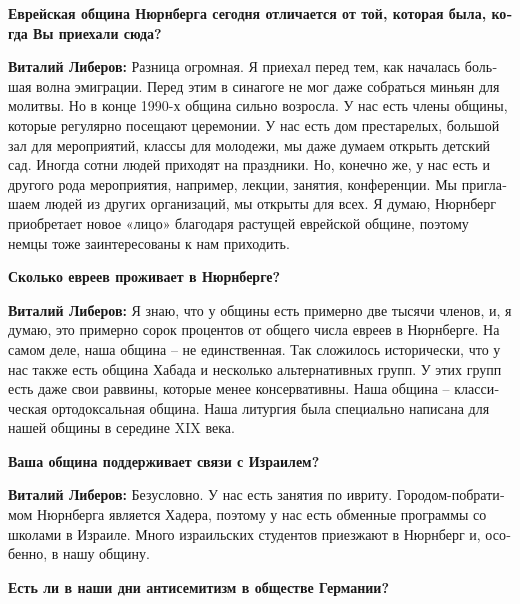 \begin{otherlanguage}{russian}
	\textbf{Еврейская община Нюрнберга сегодня отличается от той, которая была, когда Вы приехали сюда?}
	
	\textbf{Виталий Либеров:} Разница огромная. Я приехал перед тем, как началась большая волна эмиграции. Перед этим в синагоге не мог даже собраться миньян для молитвы. Но в конце 1990-х община сильно возросла. У нас есть члены общины, которые регулярно посещают церемонии. У нас есть дом престарелых, большой зал для мероприятий, классы для молодежи, мы даже думаем открыть детский сад. Иногда сотни людей приходят на праздники. Но, конечно же, у нас есть и другого рода мероприятия, например, лекции, занятия, конференции. Мы приглашаем людей из других организаций, мы открыты для всех. Я думаю, Нюрнберг приобретает новое «лицо» благодаря растущей еврейской общине, поэтому немцы тоже заинтересованы к нам приходить.  
	
	\textbf{Сколько евреев проживает в Нюрнберге?} 
	
	\textbf{Виталий Либеров:} Я знаю, что у общины есть примерно две тысячи членов, и, я думаю, это примерно сорок процентов от общего числа евреев в Нюрнберге. На самом деле, наша община – не единственная. Так сложилось исторически, что у нас также есть община Хабада и несколько альтернативных групп. У этих групп есть даже свои раввины, которые менее консервативны. Наша община – классическая ортодоксальная община. Наша литургия была специально написана для нашей общины в середине XIX века. 
	
	\textbf{Ваша община поддерживает связи с Израилем?} 
	
	\textbf{Виталий Либеров:} Безусловно. У нас есть занятия по ивриту. Городом-побратимом Нюрнберга является Хадера, поэтому у нас есть обменные программы со школами в Израиле. Много израильских студентов приезжают в Нюрнберг и, особенно, в нашу общину.  
	
	\textbf{Есть ли в наши дни антисемитизм в обществе Германии?} 
	

\end{otherlanguage}
